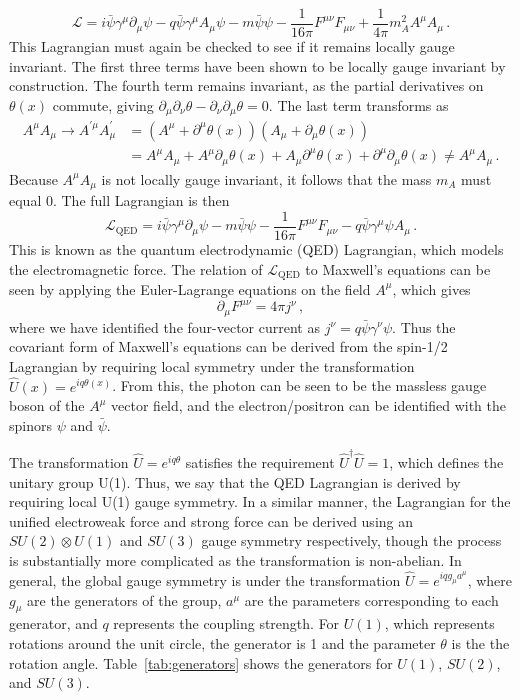\begin{equation}
	\mathcal{L}=i\bar{\psi}\gamma^\mu\partial_\mu\psi-q\bar{\psi}\gamma^\mu A_\mu\psi-m\bar{\psi}\psi-\frac{1}{16\pi}F^{\mu\nu}F_{\mu\nu}+\frac{1}{4\pi}m_{A}^2A^\mu A_\mu\,.
\end{equation}
This Lagrangian must again be checked to see if it remains locally gauge invariant. The first three terms have been shown to be locally gauge invariant by construction. The fourth term remains invariant, as the partial derivatives on $\theta(x)$ commute, giving $\partial_\mu\partial_\nu\theta-\partial_\nu\partial_\mu\theta=0$. The last term transforms as
\begin{align}
	A^\mu A_\mu\to A^{\prime\mu}A_\mu^\prime&=(A^\mu+\partial^\mu\theta(x))(A_\mu+\partial_\mu\theta(x))\\
	&=A^\mu A_\mu+A^\mu\partial_\mu\theta(x)+A_\mu\partial^\mu\theta(x)+\partial^\mu\partial_\mu\theta(x)\neq A^\mu A_\mu\,.
\end{align}
Because $A^\mu A_\mu$ is not locally gauge invariant, it follows that the mass $m_{A}$ must equal 0. The full Lagrangian is then
\begin{equation}
	\mathcal{L}_\text{QED}=i\bar{\psi}\gamma^\mu\partial_\mu\psi-m\bar{\psi}\psi-\frac{1}{16\pi}F^{\mu\nu}F_{\mu\nu}-q\bar{\psi}\gamma^\mu\psi A_\mu\,.
\end{equation}
This is known as the quantum electrodynamic (QED) Lagrangian, which models the electromagnetic force. The relation of $\mathcal{L}_\text{QED}$ to Maxwell's equations can be seen by applying the Euler-Lagrange equations on the field $A^\mu$, which gives
\begin{equation}
	\label{eq:maxwell}
	\partial_\mu F^{\mu\nu}=4\pi j^\nu\,,
\end{equation}
where we have identified the four-vector current as $j^\nu=q\bar{\psi}\gamma^\nu\psi$. Thus the covariant form of Maxwell's equations can be derived from the spin-1/2 Lagrangian by requiring local symmetry under the transformation $\hat{U}(x)=e^{iq\theta(x)}$. From this, the photon can be seen to be the massless gauge boson of the $A^\mu$ vector field, and the electron/positron can be identified with the spinors $\psi$ and $\bar{\psi}$.

The transformation $\hat{U}=e^{iq\theta}$ satisfies the requirement $\hat{U}^\dagger\hat{U}=1$, which defines the unitary group U(1). Thus, we say that the QED Lagrangian is derived by requiring local U(1) gauge symmetry. In a similar manner, the Lagrangian for the unified electroweak force and strong force can be derived using an $SU(2)\otimes U(1)$ and $SU(3)$ gauge symmetry respectively, though the process is substantially more complicated as the transformation is non-abelian. In general, the global gauge symmetry is under the transformation $\hat{U}=e^{iqg_\mu a^\mu}$, where $g_\mu$ are the generators of the group, $a^\mu$ are the parameters corresponding to each generator, and $q$ represents the coupling strength. For $U(1)$, which represents rotations around the unit circle, the generator is 1 and the parameter $\theta$ is the  the rotation angle. Table~\ref{tab:generators} shows the generators for $U(1)$, $SU(2)$, and $SU(3)$.

